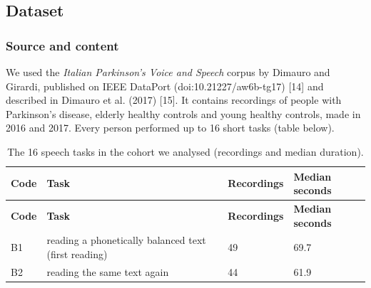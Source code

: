 \documentclass[11pt,a4paper]{article}
\begin{document}
\subsection{Dataset}\label{sec:dataset}
\subsubsection{Source and content}
We used the \emph{Italian Parkinson's Voice and Speech} corpus by Dimauro and Girardi, published on IEEE DataPort (doi:10.21227/aw6b-tg17) [14] and described in Dimauro et al. (2017) [15]. It contains recordings of people with Parkinson's disease, elderly healthy controls and young healthy controls, made in 2016 and 2017. Every person performed up to 16 short tasks (table below).

\begin{center}\small\renewcommand{\arraystretch}{1.15}
\begin{longtable}{>{\raggedright\arraybackslash}p{2.07cm}>{\raggedright\arraybackslash}p{8.60cm}>{\raggedleft\arraybackslash}p{2.07cm}>{\raggedleft\arraybackslash}p{2.07cm}}
\caption{The 16 speech tasks in the cohort we analysed (recordings and median duration).}\\
\toprule
\textbf{\hspace{0pt}Code} & \textbf{\hspace{0pt}Task} & \textbf{\hspace{0pt}Recordings} & \textbf{\hspace{0pt}Median seconds}\\\midrule\endfirsthead
\toprule
\textbf{\hspace{0pt}Code} & \textbf{\hspace{0pt}Task} & \textbf{\hspace{0pt}Recordings} & \textbf{\hspace{0pt}Median seconds}\\\midrule\endhead
\bottomrule\endfoot
\hspace{0pt}B1 & \hspace{0pt}reading a phonetically balanced text (first reading) & \hspace{0pt}49 & \hspace{0pt}69.7\\
\hspace{0pt}B2 & \hspace{0pt}reading the same text again & \hspace{0pt}44 & \hspace{0pt}61.9\\

\end{longtable}
\end{center}
\end{document}
